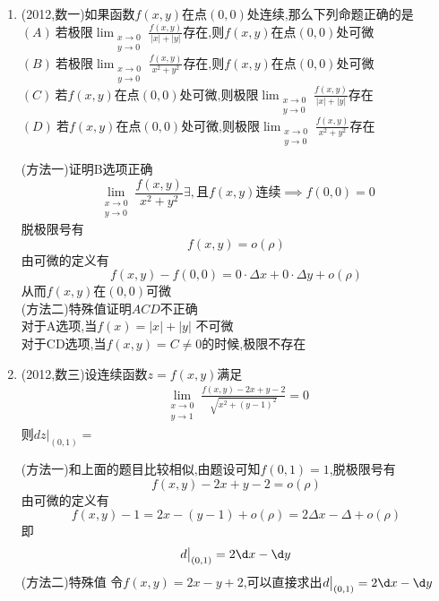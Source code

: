\documentclass[12pt, a4paper, oneside, UTF8]{ctexbook}
\begin{document}
\begin{enumerate}[label=\arabic*.]
    \item (2012,数一)如果函数$f(x,y)$在点$(0,0)$处连续,那么下列命题正确的是 \\
    $\displaystyle (A)\ \text{若极限}\lim_{\substack{x\to 0\\ y\to 0}}\frac{f(x,y)}{|x|+|y|}\text{存在,则}f(x,y)\text{在点}(0,0)\text{处可微}$ \\
    $\displaystyle (B)\ \text{若极限}\lim_{\substack{x\to 0\\ y\to 0}}\frac{f(x,y)}{x^{2}+y^{2}}\text{存在,则}f(x,y)\text{在点}(0,0)\text{处可微}$ \\
    $\displaystyle (C)\ \text{若}f(x,y)\text{在点}(0,0)\text{处可微,则极限}\lim_{\substack{x\to 0\\ y\to 0}}\frac{f(x,y)}{|x|+|y|}\text{存在}$ \\
    $\displaystyle (D)\ \text{若}f(x,y)\text{在点}(0,0)\text{处可微,则极限}\lim_{\substack{x\to 0\\ y\to 0}}\frac{f(x,y)}{x^{2}+y^{2}}\text{存在}$

    \begin{solution}
    (方法一)证明B选项正确
    $$
    \lim_{\substack{x\to 0\\y\to 0}}\frac{f(x,y)}{x^2+y^2}\exists,\text{且}f(x,y)\text{连续}\implies f(0,0) = 0 
    $$
    {\color{red} 脱极限号}有
    $$
        f(x,y) = o(\rho) 
    $$
    由可微的定义有
    $$
        f(x,y)-f(0,0)=0\cdot\Delta x + 0\cdot\Delta y + o(\rho)
    $$
    从而$f(x,y)$在$(0,0)$可微 \\
    (方法二)特殊值证明$ACD$不正确 \\
    对于A选项,当$f(x)=\left|x\right|+\left|y\right|$ 不可微 \\
    对于CD选项,当$f(x,y)=C\neq 0$的时候,极限不存在
    \end{solution}

    \item (2012,数三)设连续函数$z=f(x,y)$满足
    \begin{align*}
        \lim_{\substack{x\to 0\\ y\to 1}}\frac{f(x,y)-2x+y-2}{\sqrt{x^2+(y-1)^2}}=0
    \end{align*}
    则$\left.dz\right|_{(0,1)}=$
    
    \begin{solution}
    (方法一)和上面的题目比较相似,由题设可知$f(0,1)=1$,脱极限号有
    $$
    f(x,y)-2x+y-2=o(\rho)
    $$
    由可微的定义有
    $$
    f(x,y)-1=2x-(y-1)+o(\rho) = 2\Delta x - \Delta + o(\rho)
    $$
    即
    $$
    d\big|_{(0,1)}=2\d x-\d y
    $$
    (方法二)特殊值 令$f(x,y)=2x-y+2$,可以直接求出$d\big|_{(0,1)}=2\d x-\d y$
    \end{solution}
\end{enumerate}
\end{document}
